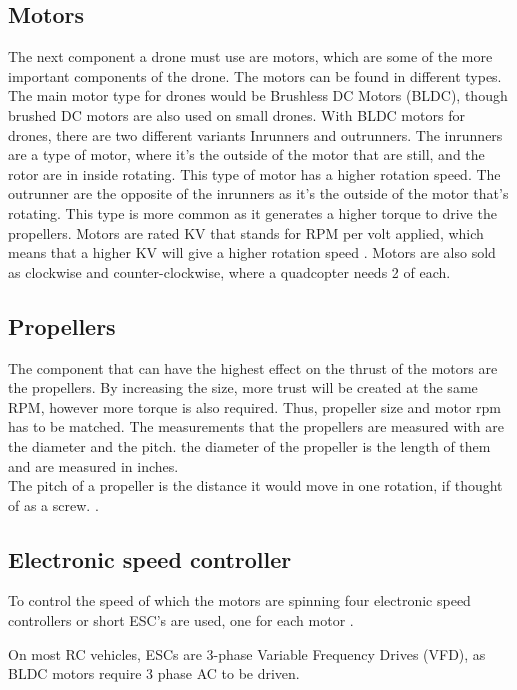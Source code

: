 \subsection{Motors}
The next component a drone must use are motors, which are some of the more important components of the drone. The motors can be found in different types. The main motor type for drones would be Brushless DC Motors (BLDC), though brushed DC motors are also used on small drones. With BLDC motors for drones, there are two different variants Inrunners and outrunners. The inrunners are a type of motor, where it’s the outside of the motor that are still, and the rotor are in inside rotating. This type of motor has a higher rotation speed. The outrunner are the opposite of the inrunners as it’s the outside of the motor that’s rotating. This type is more common as it generates a higher torque to drive the propellers.
\newline
\newline
Motors are rated KV that stands for RPM per volt applied, which means that a higher KV will give a higher rotation speed \cite{DIYDrone}. Motors are also sold as clockwise and counter-clockwise, where a quadcopter needs 2 of each.

%
%
\subsection{Propellers}
The component that can have the highest effect on the thrust of the motors are the propellers. By increasing the size, more trust will be created at the same RPM, however more torque is also required. Thus, propeller size and motor rpm has to be matched. The measurements that the propellers are measured with are the diameter and the pitch. the diameter of the propeller is the length of them and are measured in inches.\\
The pitch of a propeller is the distance it would move in one rotation, if thought of as a screw. \cite{DIYDrone}.

%
%
\subsection{Electronic speed controller}
To control the speed of which the motors are spinning four electronic speed controllers or short ESC’s are used, one for each motor \cite{QuardcoptorParts}. 

On most RC vehicles, ESCs are 3-phase Variable Frequency Drives (VFD), as BLDC motors require 3 phase AC to be driven. 

